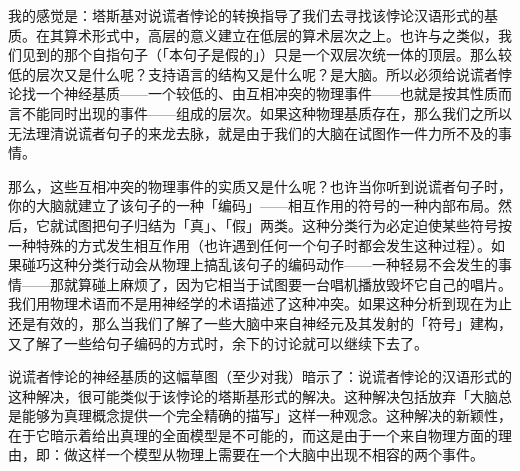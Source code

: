 \documentclass[
  12pt,
  twoside,
  openright,
  oldfontcommands,
]{memoir}
\begin{document}
我的感觉是：塔斯基对说谎者悖论的转换指导了我们去寻找该悖论汉语形式的基质。在其算术形式中，高层的意义建立在低层的算术层次之上。也许与之类似，我们见到的那个自指句子（「本句子是假的」）只是一个双层次统一体的顶层。那么较低的层次又是什么呢？支持语言的结构又是什么呢？是大脑。所以必须给说谎者悖论找一个神经基质------一个较低的、由互相冲突的物理事件------也就是按其性质而言不能同时出现的事件------组成的层次。如果这种物理基质存在，那么我们之所以无法理清说谎者句子的来龙去脉，就是由于我们的大脑在试图作一件力所不及的事情。

那么，这些互相冲突的物理事件的实质又是什么呢？也许当你听到说谎者句子时，你的大脑就建立了该句子的一种「编码」------相互作用的符号的一种内部布局。然后，它就试图把句子归结为「真」、「假」两类。这种分类行为必定迫使某些符号按一种特殊的方式发生相互作用（也许遇到任何一个句子时都会发生这种过程）。如果碰巧这种分类行动会从物理上搞乱该句子的编码动作------一种轻易不会发生的事情------那就算碰上麻烦了，因为它相当于试图要一台唱机播放毁坏它自己的唱片。我们用物理术语而不是用神经学的术语描述了这种冲突。如果这种分析到现在为止还是有效的，那么当我们了解了一些大脑中来自神经元及其发射的「符号」建构，又了解了一些给句子编码的方式时，余下的讨论就可以继续下去了。

说谎者悖论的神经基质的这幅草图（至少对我）暗示了：说谎者悖论的汉语形式的这种解决，很可能类似于该悖论的塔斯基形式的解决。这种解决包括放弃「大脑总是能够为真理概念提供一个完全精确的描写」这样一种观念。这种解决的新颖性，在于它暗示着给出真理的全面模型是不可能的，而这是由于一个来自物理方面的理由，即：做这样一个模型从物理上需要在一个大脑中出现不相容的两个事件。
\end{document}
